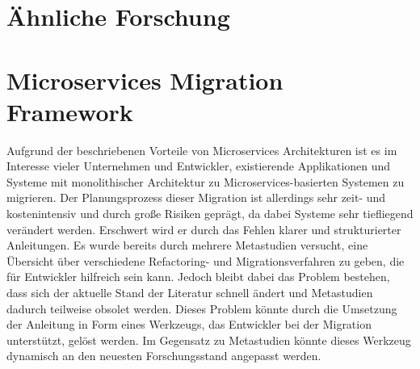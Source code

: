 %
%

\section{Ähnliche Forschung}

\section{Microservices Migration Framework}

Aufgrund der beschriebenen Vorteile von Microservices Architekturen ist es im Interesse vieler Unternehmen und Entwickler, existierende Applikationen und Systeme mit monolithischer Architektur zu Microservices-basierten Systemen zu migrieren.
Der Planungsprozess dieser Migration ist allerdings sehr zeit- und kostenintensiv und durch große Risiken geprägt, da dabei Systeme sehr tiefliegend verändert werden.
Erschwert wird er durch das Fehlen klarer und strukturierter Anleitungen.
Es wurde bereits durch mehrere Metastudien versucht, eine Übersicht über verschiedene Refactoring- und Migrationsverfahren zu geben, die für Entwickler hilfreich sein kann.
Jedoch bleibt dabei das Problem bestehen, dass sich der aktuelle Stand der Literatur schnell ändert und Metastudien dadurch teilweise obsolet werden.
Dieses Problem könnte durch die Umsetzung der Anleitung in Form eines Werkzeugs, das Entwickler bei der Migration unterstützt, gelöst werden.
Im Gegensatz zu Metastudien könnte dieses Werkzeug dynamisch an den neuesten Forschungsstand angepasst werden.

